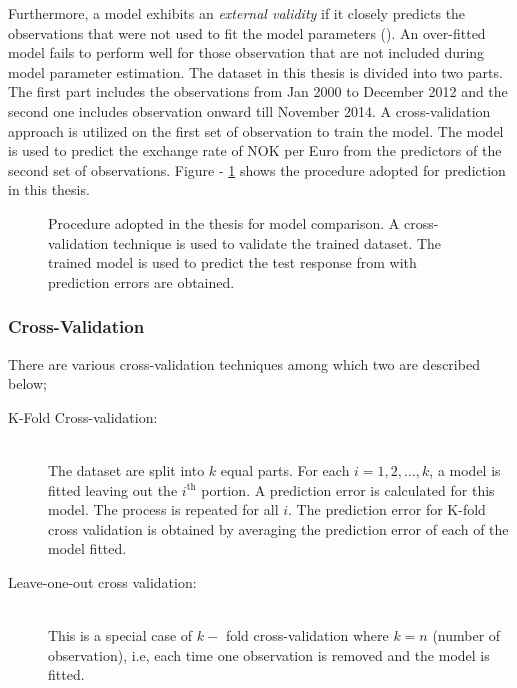 \documentclass[12pt, lot, lof]{thesis}\usepackage[]{graphicx}\usepackage[]{color}
\begin{document}
Furthermore, a model exhibits an \textit{external validity} if it closely predicts the observations that were not used to fit the model parameters (\cite[p.~72]{lattin2003analyzing}). An over-fitted model fails to perform well for those observation that are not included during model parameter estimation. The dataset in this thesis is divided into two parts. The first part includes the observations from Jan 2000 to December 2012 and the second one includes observation onward till November 2014. A cross-validation  approach is utilized on the first set of observation to train the model. The model is used to predict the exchange rate of NOK per Euro from the predictors of the second set of observations. Figure - \ref{fig:calcProcedure} shows the procedure adopted for prediction in this thesis.

\begin{figure}[ht]
\centering
    
    \caption[Procedure adopted in the thesis]{Procedure adopted in the thesis for model comparison. A cross-validation technique is used to validate the trained dataset. The trained model is used to predict the test response from with prediction errors are obtained.}
    \label{fig:calcProcedure}
\end{figure}

\subsubsection{Cross-Validation}
\label{sssec:crossValidation}
There are various cross-validation techniques among which two are described below;
\begin{description}
\item[ K-Fold Cross-validation:]\hfill \\
The dataset are split into $k$ equal parts. For each $i=1,2,\ldots, k$, a model is fitted leaving out the $i^\text{th}$ portion. A prediction error is calculated for this model. The process is repeated for all $i$. The prediction error for K-fold cross validation is obtained by averaging the prediction error of each of the model fitted.
\item[ Leave-one-out cross validation:]\hfill \\
This is a special case of $k-$ fold cross-validation where $k=n$ (number of observation), i.e, each time one observation is removed and the model is fitted.
\end{description}
\end{document}
